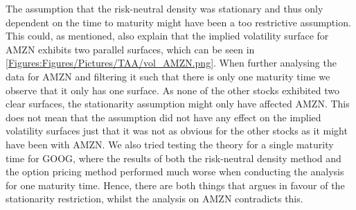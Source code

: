 The assumption that the risk-neutral density was stationary and thus only dependent on the time to maturity might have been a too restrictive assumption. This could, as mentioned, also explain that the implied volatility surface for AMZN exhibits two parallel surfaces, which can be seen in \autoref{Figures:Figures/Pictures/TAA/vol_AMZN.png}. When further analysing the data for AMZN and filtering it such that there is only one maturity time we observe that it only has one surface. As none of the other stocks exhibited two clear surfaces, the stationarity assumption might only have affected AMZN. This does not mean that the assumption did not have any effect on the implied volatility surfaces just that it was not as obvious for the other stocks as it might have been with AMZN. We also tried testing the theory for a single maturity time for GOOG, where the results of both the risk-neutral density method and the option pricing method performed much worse when conducting the analysis for one maturity time. Hence, there are both things that argues in favour of the stationarity restriction, whilst the analysis on AMZN contradicts this. 